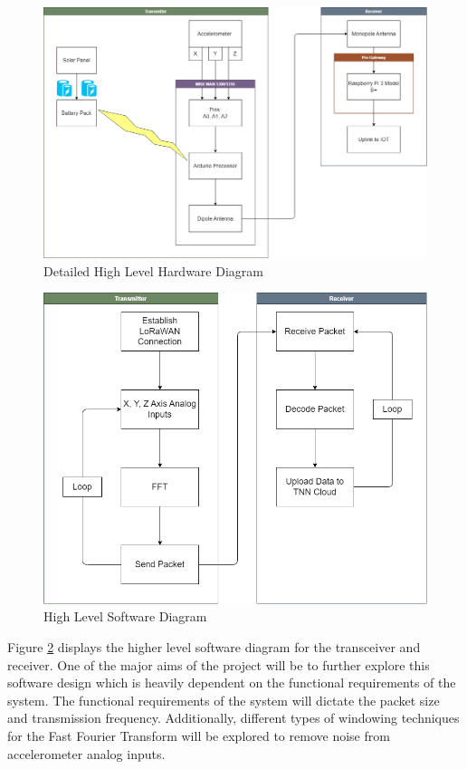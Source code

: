 \begin{figure}[h!]
\center
\includegraphics[scale=0.35]{Images/HW-Diagram-Detailed.png}
\caption{Detailed High Level Hardware Diagram}
\label{fig:HL-HW-Diagram-Detailed}
\end{figure}

\begin{figure}[h!]
\center
\includegraphics[scale=0.35]{Images/SW-Diagram.png}
\caption{High Level Software Diagram}
\label{fig:HL-SW-Diagram}
\end{figure}

Figure \ref{fig:HL-SW-Diagram} displays the higher level software diagram for the transceiver and receiver.  One of the major aims of the project will be to further explore this software design which is heavily dependent on the functional requirements of the system. The functional requirements of the system will  dictate the packet size and transmission frequency. Additionally, different types of windowing techniques for the Fast Fourier Transform will be explored to remove noise from accelerometer analog inputs. 

